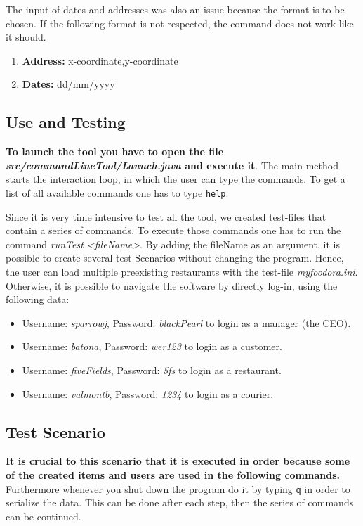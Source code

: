 The input of dates and addresses was also an issue because the format is to be chosen. If the 
following format is not respected, the command does not work like it should.
\begin{enumerate}
	\item \textbf{Address: } x-coordinate,y-coordinate
	\item \textbf{Dates: } dd/mm/yyyy
\end{enumerate}

\subsection{Use and Testing}
\label{sub:use_and_testing}

\textbf{To launch the tool you have to open the file \textit{src/commandLineTool/Launch.java} and execute
it}. The main method starts the interaction loop, in which the user can type the commands. To get
a list of all available commands one has to type \lstinline|help|. 

Since it is very time intensive to test all the tool, we created test-files that
contain a series of commands. To execute those commands one has to run the command 
\textit{runTest <fileName>}. By adding the fileName as an argument, it is possible to create 
several test-Scenarios without changing the program. Hence, the user can load multiple 
preexisting restaurants with the test-file \textit{my\textunderscore foodora.ini}.
Otherwise, it is possible to navigate the software by directly log-in, using the following data:
\begin{itemize}
	\item{}Username: \textit{sparrowj}, Password: \textit{blackPearl} to login as a manager (the CEO).
	\item{}Username: \textit{batona}, Password: \textit{wer123} to login as a customer.
	\item{}Username: \textit{fiveFields}, Password: \textit{5fs} to login as a restaurant.
	\item{}Username: \textit{valmontb}, Password: \textit{1234} to login as a courier.
\end{itemize}

\subsection{Test Scenario}
\label{sub:test_scenario}

\textbf{It is crucial to this scenario that it is executed in order because some of the created items and 
users are used in the following commands.} Furthermore whenever you shut down the program do it by
typing \lstinline|q| in order to serialize the data. This can be done after each step, then the 
series of commands can be continued.

